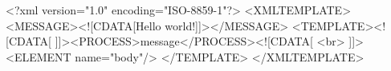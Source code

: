 <?xml version="1.0" encoding="ISO-8859-1"?>
<XMLTEMPLATE>
    <MESSAGE><![CDATA[Hello world!]]></MESSAGE>
    <TEMPLATE><![CDATA[
            ]]><PROCESS>message</PROCESS><![CDATA[ <br>
        ]]><ELEMENT name="body"/>
    </TEMPLATE>
</XMLTEMPLATE>
